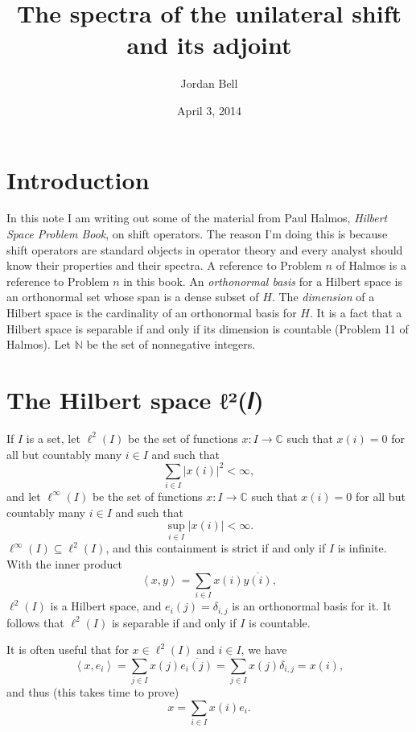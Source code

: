 \documentclass{article}
\newcommand{\inner}[2]{\left\langle #1, #2 \right\rangle}
\begin{document}
\title{The spectra of the unilateral shift  and its adjoint}
\author{Jordan Bell}
\date{April 3, 2014}
\maketitle

\section{Introduction}
In this note I am writing out some of the material from Paul Halmos, {\em Hilbert Space Problem Book}, on shift operators. The reason I'm doing this is because shift operators are standard objects in operator theory and every analyst should know their
properties and their spectra. A reference to Problem $n$ of Halmos is a reference to Problem $n$ in this book. 
An {\em orthonormal basis} for a Hilbert space is an orthonormal set whose span is a dense subset of $H$. The {\em dimension} of a Hilbert space is the cardinality of
an orthonormal basis for $H$. It is a fact that a Hilbert space is separable if and only if its dimension is countable (Problem 11 of Halmos). 
Let $\mathbb{N}$ be the set of nonnegative integers.

\section{The Hilbert space ℓ²(𝐼)}
If $I$ is a set, let $\ell^2(I)$ be the set of functions $x:I \to \mathbb{C}$ such that $x(i)=0$ for all but countably many $i \in I$ and such
that 
\[
\sum_{i \in I} |x(i)|^2 < \infty,
\]
and let $\ell^\infty(I)$ be the set of functions $x:I \to \mathbb{C}$ such that $x(i)=0$ for all but countably many $i \in I$ and such that
\[
\sup_{i \in I} |x(i)| < \infty.
\]
$\ell^\infty(I) \subseteq \ell^2(I)$, and this containment is strict if and only if $I$ is infinite.
With the inner product
\[
\inner{x}{y}=\sum_{i \in I} x(i) \overline{y(i)},
\]
$\ell^2(I)$ is a Hilbert space, and $e_i(j)=\delta_{i,j}$ is an orthonormal basis for it. It follows that
$\ell^2(I)$ is separable if and only if $I$ is countable.

It is often useful that for $x \in \ell^2(I)$ and $i \in I$, we have
\[
\inner{x}{e_i}=\sum_{j \in I} x(j) \overline{e_i(j)} = \sum_{j \in I} x(j) \delta_{i,j} = x(i),
\]
and thus (this takes time to prove)
\[
x=\sum_{i \in I} x(i) e_i.
\]
\end{document}
